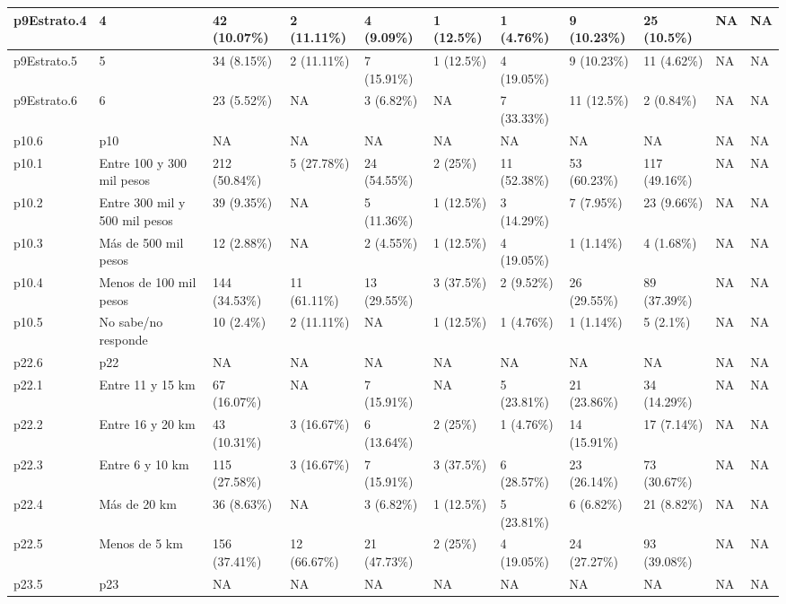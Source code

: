 \begin{table}
{\begin{tabular}[t]{l|l|l|l|l|l|l|l|l|l|l}
\hline
p9Estrato.4 & 4 & 42 (10.07\%) & 2 (11.11\%) & 4 (9.09\%) & 1 (12.5\%) & 1 (4.76\%) & 9 (10.23\%) & 25 (10.5\%) & NA & NA\\
\hline
p9Estrato.5 & 5 & 34 (8.15\%) & 2 (11.11\%) & 7 (15.91\%) & 1 (12.5\%) & 4 (19.05\%) & 9 (10.23\%) & 11 (4.62\%) & NA & NA\\
\hline
p9Estrato.6 & 6 & 23 (5.52\%) & NA & 3 (6.82\%) & NA & 7 (33.33\%) & 11 (12.5\%) & 2 (0.84\%) & NA & NA\\
\hline
p10.6 & p10 & NA & NA & NA & NA & NA & NA & NA & NA & NA\\
\hline
p10.1 & Entre 100 y 300 mil pesos & 212 (50.84\%) & 5 (27.78\%) & 24 (54.55\%) & 2 (25\%) & 11 (52.38\%) & 53 (60.23\%) & 117 (49.16\%) & NA & NA\\
\hline
p10.2 & Entre 300 mil y 500 mil pesos & 39 (9.35\%) & NA & 5 (11.36\%) & 1 (12.5\%) & 3 (14.29\%) & 7 (7.95\%) & 23 (9.66\%) & NA & NA\\
\hline
p10.3 & Más de 500 mil pesos & 12 (2.88\%) & NA & 2 (4.55\%) & 1 (12.5\%) & 4 (19.05\%) & 1 (1.14\%) & 4 (1.68\%) & NA & NA\\
\hline
p10.4 & Menos de 100 mil pesos & 144 (34.53\%) & 11 (61.11\%) & 13 (29.55\%) & 3 (37.5\%) & 2 (9.52\%) & 26 (29.55\%) & 89 (37.39\%) & NA & NA\\
\hline
p10.5 & No sabe/no responde & 10 (2.4\%) & 2 (11.11\%) & NA & 1 (12.5\%) & 1 (4.76\%) & 1 (1.14\%) & 5 (2.1\%) & NA & NA\\
\hline
p22.6 & p22 & NA & NA & NA & NA & NA & NA & NA & NA & NA\\
\hline
p22.1 & Entre 11 y 15 km & 67 (16.07\%) & NA & 7 (15.91\%) & NA & 5 (23.81\%) & 21 (23.86\%) & 34 (14.29\%) & NA & NA\\
\hline
p22.2 & Entre 16 y 20 km & 43 (10.31\%) & 3 (16.67\%) & 6 (13.64\%) & 2 (25\%) & 1 (4.76\%) & 14 (15.91\%) & 17 (7.14\%) & NA & NA\\
\hline
p22.3 & Entre 6 y 10 km & 115 (27.58\%) & 3 (16.67\%) & 7 (15.91\%) & 3 (37.5\%) & 6 (28.57\%) & 23 (26.14\%) & 73 (30.67\%) & NA & NA\\
\hline
p22.4 & Más de 20 km & 36 (8.63\%) & NA & 3 (6.82\%) & 1 (12.5\%) & 5 (23.81\%) & 6 (6.82\%) & 21 (8.82\%) & NA & NA\\
\hline
p22.5 & Menos de 5 km & 156 (37.41\%) & 12 (66.67\%) & 21 (47.73\%) & 2 (25\%) & 4 (19.05\%) & 24 (27.27\%) & 93 (39.08\%) & NA & NA\\
\hline
p23.5 & p23 & NA & NA & NA & NA & NA & NA & NA & NA & NA\\

\end{tabular}}
\end{table}
